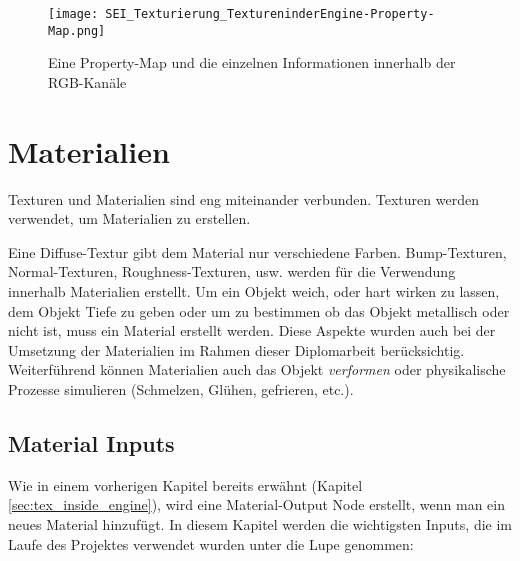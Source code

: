 \begin{figure}[H]
    \centering
    \texttt{[image: SEI\_Texturierung\_TextureninderEngine-Property-Map.png]}
    \caption{Eine Property-Map und die einzelnen Informationen innerhalb der RGB-Kanäle}
    \label{picture:property_map}
\end{figure}


\section{Materialien}
\label{sec:materials}

Texturen und Materialien sind eng miteinander verbunden. Texturen werden verwendet, um Materialien zu erstellen.

Eine Diffuse-Textur gibt dem Material nur verschiedene Farben. Bump-Texturen, Normal-Texturen, Roughness-Texturen, usw.
werden für die Verwendung innerhalb Materialien erstellt. Um ein Objekt weich, oder hart wirken zu lassen, dem
Objekt Tiefe zu geben oder um zu bestimmen ob das Objekt metallisch oder nicht ist, muss ein Material erstellt werden.
Diese Aspekte wurden auch bei der Umsetzung der Materialien im Rahmen dieser Diplomarbeit berücksichtig. Weiterführend
können Materialien auch das Objekt \textit{verformen} oder physikalische Prozesse simulieren (Schmelzen, Glühen,
gefrieren, etc.).

\subsection{Material Inputs}
\label{sec:mat_inputs}

Wie in einem vorherigen Kapitel bereits erwähnt (Kapitel \ref{sec:tex_inside_engine}), wird eine Material-Output Node
erstellt, wenn man ein neues Material hinzufügt. In diesem Kapitel werden die wichtigsten Inputs, die im Laufe des
Projektes verwendet wurden unter die Lupe genommen:

